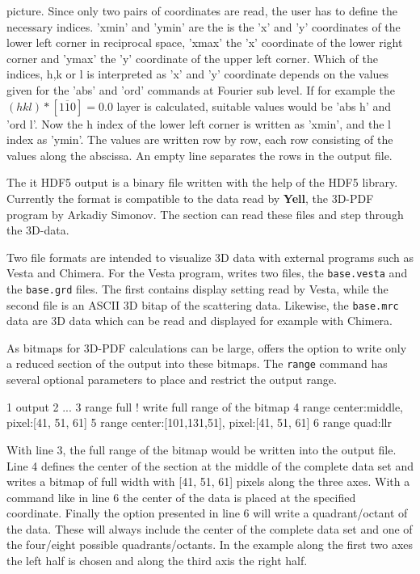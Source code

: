 picture.  Since only two pairs of coordinates are read, the user has
to define the necessary indices. 'xmin' and 'ymin' are the is the
'x' and 'y' coordinates of the lower left corner in reciprocal
space, 'xmax' the 'x' coordinate of the lower right corner and
'ymax' the 'y' coordinate of the upper left corner.  Which of the
indices, h,k or l is interpreted as 'x' and 'y' coordinate depends
on the values given for the 'abs' and 'ord' commands at Fourier
sub level.  If for example the $(hkl)*[1 \overline{1} 0] = 0.0$ layer
is calculated, suitable values would be 'abs h' and 'ord l'. Now the
h index of the lower left corner is written as 'xmin', and the l
index as 'ymin'.  The values are written row by row, each row
consisting of the values along the abscissa.  An empty line
separates the rows in the output file.\par

The {it HDF5} output is a binary file written with the help of
the HDF5 library. Currently the format is compatible to the 
data read by {\bf Yell}, the 3D-PDF program by Arkadiy Simonov.
The \Kuplot section can read these files and step through the 3D-data.

Two file formats are intended to visualize 3D data with external 
programs such as Vesta and Chimera. For the Vesta program, 
\Discus writes two files, the {\tt base.vesta} and the {\tt base.grd}
files. The first contains display setting read by Vesta, while the
second file is an ASCII 3D bitap of the scattering data. Likewise,
the {\tt base.mrc} data are 3D data which can be read and displayed
for example with Chimera. 

As bitmaps for 3D-PDF calculations can be large, \Discus offers 
the option to write only a reduced section of the output into these
bitmaps. The {\tt range} command has several optional parameters to 
place and restrict the output range.

\begin{MacVerbatim}
    1  output
    2    ...
    3    range full    ! write full range of the bitmap
    4    range center:middle, pixel:[41, 51, 61]  
    5    range center:[101,131,51], pixel:[41, 51, 61]  
    6    range quad:llr
\end{MacVerbatim}

With line 3, the full range of the bitmap would be written into the output
file. Line 4 defines the center of the section at the middle of the complete
data set and writes a bitmap of full width with [41, 51, 61] pixels along
the three axes. With a command like in line 6 the center of the data is 
placed at the specified coordinate. Finally the option presented in line 6
will write a quadrant/octant of the data. These will always include the center 
of the complete data set and one of the four/eight possible quadrants/octants. 
In the example along the first two axes the left half is chosen and along the 
third axis the right half. 

